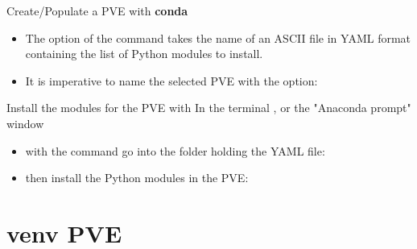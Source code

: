 \documentclass[10pt,serif,mathserif,compress,hyperref={colorlinks}]{beamer}
\begin{document}
\begin{frame}{Create/Populate a PVE with \textbf{conda}}

  \begin{tcolorbox}[title={\bf Populate a conda PVE}]
    
    \begin{itemize}
    \item The  option of the  command takes the name of an ASCII file
      in YAML format containing the list of Python modules to install.
     \item It is imperative to name the selected PVE with the option: \\
     \end{itemize}
    
\end{tcolorbox}

  \begin {bclogo}[noborder=true, couleur=gray!50, couleurBarre=Chocolate, logo=\bctrombone, marge=0, margeG=-.8]
    {Install the modules for the  PVE with }\smallskip
    {\small In the terminal , or the "Anaconda prompt" window \DarkGray{\footnotesize [Windows]}}\\[-4mm]
      \begin{itemize}
      \item with the  command go into the folder holding the YAML file:\\
      \item then install the Python modules in the  PVE:\\
      \end{itemize}
  \end{bclogo}
  
  
\end{frame}

\section{venv PVE}
\end{document}
